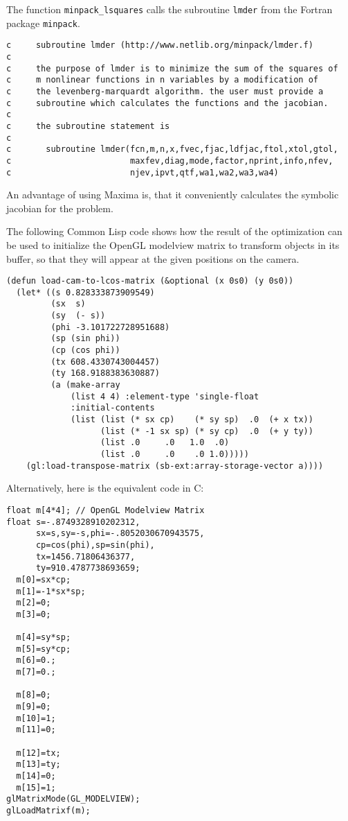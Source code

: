 The function \verb!minpack_lsquares! calls the subroutine \verb!lmder!
from the Fortran package \verb!minpack!.
{\small
\begin{verbatim}
c     subroutine lmder (http://www.netlib.org/minpack/lmder.f)
c
c     the purpose of lmder is to minimize the sum of the squares of
c     m nonlinear functions in n variables by a modification of
c     the levenberg-marquardt algorithm. the user must provide a
c     subroutine which calculates the functions and the jacobian.
c
c     the subroutine statement is
c
c       subroutine lmder(fcn,m,n,x,fvec,fjac,ldfjac,ftol,xtol,gtol,
c                        maxfev,diag,mode,factor,nprint,info,nfev,
c                        njev,ipvt,qtf,wa1,wa2,wa3,wa4)
\end{verbatim}}

An advantage of using Maxima is, that it conveniently calculates
the symbolic jacobian for the problem.

The following Common Lisp code shows how the result of the
optimization can be used to initialize the OpenGL modelview matrix to
transform objects in its buffer, so that they will appear at the given
positions on the camera.

{\small\begin{verbatim}
(defun load-cam-to-lcos-matrix (&optional (x 0s0) (y 0s0))
  (let* ((s 0.828333873909549)
         (sx  s)
         (sy  (- s))
         (phi -3.101722728951688)
         (sp (sin phi))
         (cp (cos phi))
         (tx 608.4330743004457)
         (ty 168.9188383630887)
         (a (make-array
             (list 4 4) :element-type 'single-float
             :initial-contents
             (list (list (* sx cp)    (* sy sp)  .0  (+ x tx))
                   (list (* -1 sx sp) (* sy cp)  .0  (+ y ty))
                   (list .0     .0   1.0  .0)
                   (list .0     .0    .0 1.0)))))
    (gl:load-transpose-matrix (sb-ext:array-storage-vector a))))    
\end{verbatim}}
  
  Alternatively, here is the equivalent code in C:

{\small\begin{verbatim}
float m[4*4]; // OpenGL Modelview Matrix
float s=-.8749328910202312,
      sx=s,sy=-s,phi=-.8052030670943575,
      cp=cos(phi),sp=sin(phi),
      tx=1456.71806436377,
      ty=910.4787738693659;
  m[0]=sx*cp;
  m[1]=-1*sx*sp;
  m[2]=0;
  m[3]=0;
  
  m[4]=sy*sp;
  m[5]=sy*cp;
  m[6]=0.;
  m[7]=0.;

  m[8]=0;
  m[9]=0;
  m[10]=1;
  m[11]=0;
  
  m[12]=tx;
  m[13]=ty;
  m[14]=0;
  m[15]=1;
glMatrixMode(GL_MODELVIEW);
glLoadMatrixf(m);
\end{verbatim}}

